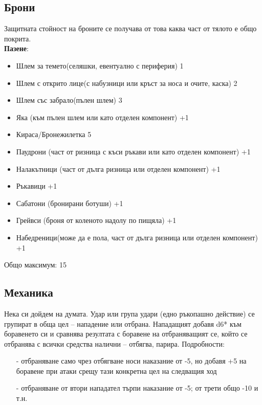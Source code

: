 \subsection{Брони}
Защитната стойност на броните се получава от това каква част от тялото е общо покрита.
\\[1cm]
\textbf{Пазене}:
\begin{itemize}[topsep=-0cm, partopsep=0cm, parsep=0cm, itemsep=0cm]
\item{Шлем за темето(селяшки, евентуално с периферия) 1}
\item{Шлем с открито лице(с набузници или кръст за носа и очите, каска) 2}
\item{Шлем със забрало(пълен шлем) 3}
\item{Яка (към пълен шлем или като отделен компонент) +1}

\item{Кираса/Бронежилетка 5}

\item{Паудрони (част от ризница с къси ръкави или като отделен компонент) +1}
\item{Налакътници (част от дълга ризница или отделен компонент) +1}
\item{Ръкавици +1}

\item{Сабатони (бронирани ботуши) +1}
\item{Грейвси (броня от коленото надолу по пищяла) +1}
\item{Набедреници(може да е пола, част от дълга ризница или отделен компонент) +1}
\end{itemize}

Общо максимум: 15

\subsection{Механика}
Нека си дойдем на думата.
Удар или група удари (едно ръкопашно действие) се групират в обща цел – нападение или отбрана.
Нападащият добавя d6* към боравенето си и сравнява резултата с боравене на отбраняващият се, който се отбранява с всички средства налични – отбягва, парира.
Подробности:
\begin{itemize}
\item[-]{отбраняване само чрез отбягване носи наказание от -5, но добавя +5 на боравене при атаки срещу тази конкретна цел на следващия ход}
\item[-]{отбраняване от втори нападател търпи наказание от -5; от трети общо -10 и т.н.}
\end{itemize}

